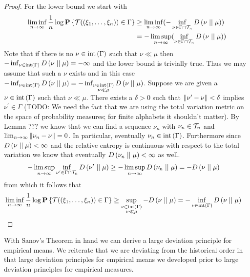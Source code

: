 \begin{proof}
For the lower bound we start with
\begin{align*}
\liminf_{n \to \infty} \frac{1}{n} \log \textbf{P}\left \{\mathcal{T}((\xi_1, \dotsc, \xi_n)) \in \Gamma \right \} 
&\geq \liminf_{n \to \infty} (-\inf_{\nu \in \Gamma \cap \mathcal{T}_{n}} D\left( \nu \mid\mid \mu \right)) \\
&= -\limsup_{n \to \infty} (\inf_{\nu \in \Gamma \cap \mathcal{T}_{n}} D\left( \nu \mid\mid \mu \right))
\end{align*}
Note that if there is no $\nu \in \operatorname*{int} \left( \Gamma \right)$ such that $\nu \ll \mu$ then $-\inf_{\nu \in \operatorname*{int} \left( \Gamma \right)} D\left( \nu \mid\mid \mu \right)= -\infty$
and the lower bound is trivially true.  Thus we may assume that such a $\nu$ exists and in this case
$-\inf_{\nu \in \operatorname*{int} \left( \Gamma \right)} D\left( \nu \mid\mid \mu \right) = -\inf_{\substack{\nu \in \operatorname*{int} \left( \Gamma \right) \\ \nu \ll \mu}} D\left( \nu \mid\mid \mu \right)$.
Suppose we are given a $\nu \in \operatorname*{int} \left( \Gamma \right)$ such that $\nu \ll \mu$.
There exists a $\delta >0$ such that $\left \lVert \nu^\prime - \nu \right \rVert < \delta$ implies $\nu^\prime \in \Gamma$ (TODO: We need the fact that
we are using the total variation metric on the space of probability measures; for finite alphabets it shouldn't matter).  By Lemma ??? we know that we
can find a sequence $\nu_n$ with $\nu_n \in \mathcal{T}_{n}$ and $\lim_{n \to \infty} \left \lVert \nu_n - \nu \right \rVert = 0$.  In particular, eventually $\nu_n \in \operatorname*{int} \left( \Gamma \right)$.  Furthermore since $D\left( \nu \mid\mid \mu \right) < \infty$ and the relative entropy is continuous with respect to the total variation we know that 
eventually $D\left( \nu_n \mid\mid \mu \right) < \infty$ as well.
\begin{align*}
- \limsup_{n \to \infty} \inf_{\nu^\prime \in \Gamma \cap \mathcal{T}_{n}} D\left( \nu^\prime \mid\mid \mu \right) 
&\geq - \limsup_{n \to \infty} D\left( \nu_n \mid\mid \mu \right) = -D\left( \nu \mid\mid \mu \right)
\end{align*}
from which it follows that
\begin{align*}
\liminf_{n \to \infty} \frac{1}{n} \log \textbf{P}\left \{\mathcal{T}((\xi_1, \dotsc, \xi_n)) \in \Gamma \right \} 
&\geq \sup_{\substack{\nu \in \operatorname*{int} \left( \Gamma \right)\\ \nu \ll \mu}} -D\left( \nu \mid\mid \mu \right) = -\inf_{\nu \in \operatorname*{int} \left( \Gamma \right)} D\left( \nu \mid\mid \mu \right)
\end{align*}
\end{proof}

With Sanov's Theorem in hand we can derive a large deviation principle for empirical means.  We reiterate that we are deviating from the historical order in
that large deviation principles for empirical means we developed prior to large deviation principles for empirical measures.

